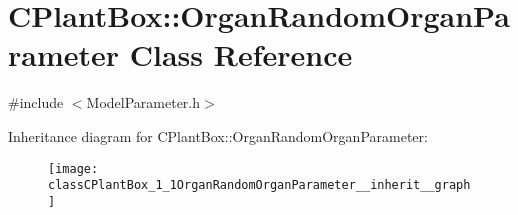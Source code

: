 \hypertarget{classCPlantBox_1_1OrganRandomOrganParameter}{}\section{C\+Plant\+Box\+:\+:Organ\+Random\+Organ\+Parameter Class Reference}
\label{classCPlantBox_1_1OrganRandomOrganParameter}


{\ttfamily \#include $<$Model\+Parameter.\+h$>$}



Inheritance diagram for C\+Plant\+Box\+:\+:Organ\+Random\+Organ\+Parameter\+:\nopagebreak
\begin{figure}[H]
\begin{center}
\leavevmode
\texttt{[image: classCPlantBox\_1\_1OrganRandomOrganParameter\_\_inherit\_\_graph]}
\end{center}
\end{figure}
